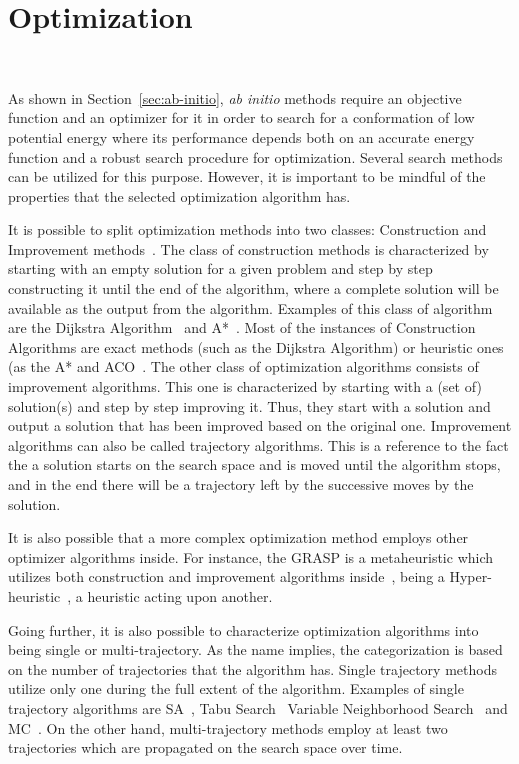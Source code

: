 \section{Optimization}~\label{sec:bioinspired}

As shown in Section~\ref{sec:ab-initio}, \textit{ab initio} methods require an
objective function and an optimizer for it in order to search for a
conformation of low potential energy where its performance depends both on an
accurate energy function and a robust search procedure for optimization.
Several search methods can be utilized for this purpose. However, it is
important to be mindful of the properties that the selected optimization
algorithm has.

It is possible to split optimization methods into two classes: Construction and
Improvement methods~\cite{russell2016artificial}. The class of construction
methods is characterized by starting with an empty solution for a given problem
and step by step constructing it until the end of the algorithm, where a
complete solution will be available as the output from the algorithm. Examples
of this class of algorithm are the Dijkstra
Algorithm~\cite{dijkstra1959dijkstra} and A*~\cite{hart1968formal}. Most of the
instances of Construction Algorithms are exact methods (such as the Dijkstra
Algorithm) or heuristic ones (as the A* and \ac{ACO}~\cite{dorigo1999ant}.  The
other class of optimization algorithms consists of improvement algorithms. This
one is characterized by starting with a (set of) solution(s) and step by step
improving it. Thus, they start with a solution and output a solution that has
been improved based on the original one. Improvement algorithms can also be
called trajectory algorithms. This is a reference to the fact the a solution
starts on the search space and is moved until the algorithm stops, and in the
end there will be a trajectory left by the successive moves by the solution.

It is also possible that a more complex optimization method employs other
optimizer algorithms inside. For instance, the \ac{GRASP} is a metaheuristic
which utilizes both construction and improvement algorithms
inside~\cite{feo1995greedy}, %
being a Hyper-heuristic~\cite{burke2003hyper}, a heuristic acting upon another.

Going further, it is also possible to characterize optimization algorithms into
being single or multi-trajectory. As the name implies, the categorization is
based on the number of trajectories that the algorithm has. Single trajectory
methods utilize only one during the full extent of the algorithm. Examples of
single trajectory algorithms are \ac{SA}~\cite{kirkpatrick1983optimization},
Tabu Search~\cite{glover1998tabu} Variable Neighborhood
Search~\cite{mladenovic1997variable} and \ac{MC}~\cite{hastings1970monte}. On
the other hand, multi-trajectory methods employ at least two trajectories which
are propagated on the search space over time.


